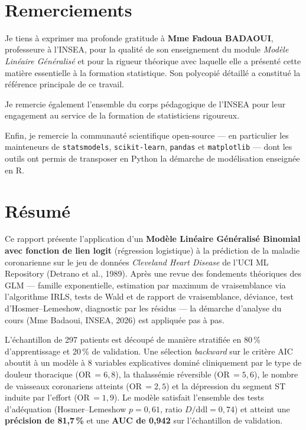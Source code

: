 \documentclass[11pt,a4paper,twoside]{report}
\theoremstyle{definition}
\begin{document}
\newpage\thispagestyle{empty}~\newpage

\chapter*{Remerciements}

Je tiens à exprimer ma profonde gratitude à \textbf{Mme Fadoua BADAOUI},
professeure à l'INSEA, pour la qualité de son enseignement du module
\emph{Modèle Linéaire Généralisé} et pour la rigueur théorique avec
laquelle elle a présenté cette matière essentielle à la formation
statistique. Son polycopié détaillé a constitué la référence principale
de ce travail.

Je remercie également l'ensemble du corps pédagogique de l'INSEA pour
leur engagement au service de la formation de statisticiens rigoureux.

Enfin, je remercie la communauté scientifique open-source --- en
particulier les mainteneurs de \texttt{statsmodels}, \texttt{scikit-learn},
\texttt{pandas} et \texttt{matplotlib} --- dont les outils ont permis de
transposer en Python la démarche de modélisation enseignée en R.

\chapter*{Résumé}

Ce rapport présente l'application d'un \textbf{Modèle Linéaire Généralisé
Binomial avec fonction de lien logit} (régression logistique) à la
prédiction de la maladie coronarienne sur le jeu de données
\emph{Cleveland Heart Disease} de l'UCI ML Repository (Detrano et al.,
1989). Après une revue des fondements théoriques des GLM --- famille
exponentielle, estimation par maximum de vraisemblance via l'algorithme
IRLS, tests de Wald et de rapport de vraisemblance, déviance, test
d'Hosmer--Lemeshow, diagnostic par les résidus --- la démarche
d'analyse du cours (Mme Badaoui, INSEA, 2026) est appliquée pas à pas.

L'échantillon de 297 patients est découpé de manière stratifiée en 80\,\%
d'apprentissage et 20\,\% de validation. Une sélection \emph{backward} sur
le critère AIC aboutit à un modèle à 8 variables explicatives dominé
cliniquement par le type de douleur thoracique (OR\,$= 6{,}8$), la
thalassémie réversible (OR\,$= 5{,}6$), le nombre de vaisseaux
coronariens atteints (OR\,$= 2{,}5$) et la dépression du segment ST
induite par l'effort (OR\,$= 1{,}9$). Le modèle satisfait l'ensemble des
tests d'adéquation (Hosmer--Lemeshow $p = 0{,}61$, ratio
$D/\mathrm{ddl} = 0{,}74$) et atteint une \textbf{précision de 81,7\,\%}
et une \textbf{AUC de 0,942} sur l'échantillon de validation.
\end{document}
